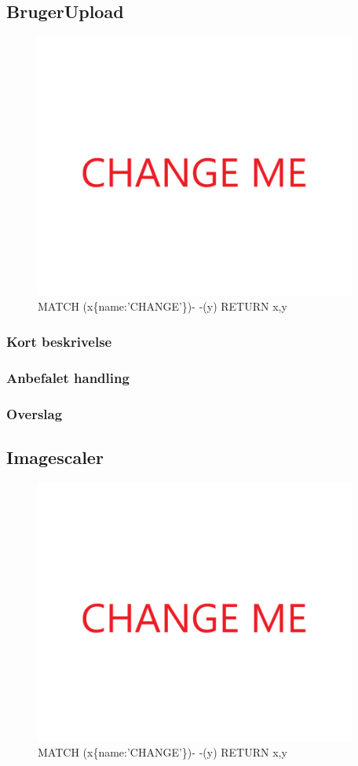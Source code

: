 \documentclass{article}
\begin{document}
\subsection{BrugerUpload}
\begin{figure}[h]
\includegraphics[width=300pt]{CHANGE.PNG}
\caption{MATCH (x\{name:'CHANGE'\})- -(y) RETURN x,y}
\end{figure}
\subsubsection{Kort beskrivelse}
\subsubsection{Anbefalet handling}
\subsubsection{Overslag}
\subsection{Imagescaler}
\begin{figure}[h]
\includegraphics[width=300pt]{CHANGE.PNG}
\caption{MATCH (x\{name:'CHANGE'\})- -(y) RETURN x,y}
\end{figure}
\end{document}
